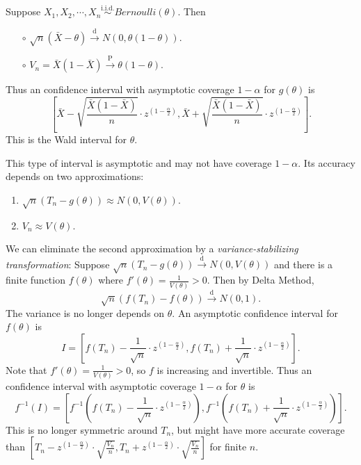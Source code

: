 \documentclass[a4paper]{article}
\begin{document}
\begin{eg}
	Suppose $X_1,X_2,\cdots,X_n \stackrel{\text{i.i.d.}}{\sim} Bernoulli(\theta)$. Then
	\begin{itemize}
		\item[$\circ$] $\sqrt{n}(\bar{X} - \theta) \stackrel{\text{d}}{\longrightarrow} N(0,\theta(1-\theta))$.
		\item[$\circ$] $V_n = \bar{X}(1-\bar{X}) \stackrel{\text{P}}{\longrightarrow} \theta(1-\theta)$.
	\end{itemize}
	Thus an confidence interval with asymptotic coverage $1-\alpha$ for $g(\theta)$ is
	\begin{equation}
		\left[\bar{X}-\sqrt{\frac{\bar{X}(1-\bar{X})}{n}} \cdot z^{(1-\frac{\alpha}{2})},   \bar{X}+\sqrt{\frac{\bar{X}(1-\bar{X})}{n}} \cdot z^{(1-\frac{\alpha}{2})}\right].
	\end{equation}
	This is the Wald interval for $\theta$.
\end{eg}

\begin{note}
	This type of interval is asymptotic and may not have coverage $1-\alpha$. Its accuracy depends on two approximations:
	\begin{enumerate}
		\item $\sqrt{n}(T_n - g(\theta)) \approx N(0,V(\theta))$.
		\item $V_n \approx V(\theta)$.
	\end{enumerate}
	We can eliminate the second approximation by a \emph{variance-stabilizing transformation}: Suppose $\sqrt{n}(T_n-g(\theta)) \stackrel{\text{d}}{\longrightarrow} N(0,V(\theta))$ and there is a finite function $f(\theta)$ where $f'(\theta) = \frac{1}{V(\theta)} > 0$. Then by Delta Method,
	\begin{equation}
		\sqrt{n} (f(T_n) - f(\theta)) \stackrel{\text{d}}{\longrightarrow} N(0,1).
	\end{equation}
	The variance is no longer depends on $\theta$. An asymptotic confidence interval for $f(\theta)$ is
	\begin{equation}
		I = \left[f(T_n) - \frac{1}{\sqrt{n}} \cdot z^{(1-\frac{\alpha}{2})},f(T_n) + \frac{1}{\sqrt{n}} \cdot z^{(1-\frac{\alpha}{2})}\right].
	\end{equation}
	Note that $f'(\theta) = \frac{1}{V(\theta)} > 0$, so $f$ is increasing and invertible. Thus an confidence interval with asymptotic coverage $1-\alpha$ for $\theta$ is
	\begin{equation}
		f^{-1}(I) = \left[f^{-1}(f(T_n) - \frac{1}{\sqrt{n}} \cdot z^{(1-\frac{\alpha}{2})}),f^{-1}(f(T_n) + \frac{1}{\sqrt{n}} \cdot z^{(1-\frac{\alpha}{2})})\right].
	\end{equation}
	This is no longer symmetric around $T_n$, but might have more accurate coverage than $\left[T_n - z^{(1-\frac{\alpha}{2})} \cdot \sqrt{\frac{V_n}{n}}, T_n + z^{(1-\frac{\alpha}{2})} \cdot \sqrt{\frac{V_n}{n}}\right]$ for finite $n$.
\end{note}
\end{document}

